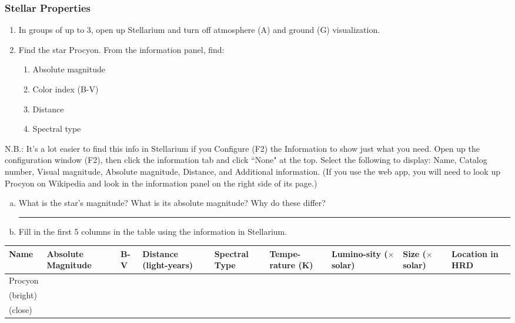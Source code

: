 \documentclass[main.tex]{subfiles}
\begin{document}
\subsubsection{Stellar Properties}
\begin{enumerate}
\item In groups of up to 3, open up Stellarium and turn off atmosphere (A) and ground (G) visualization.
\item Find the star Procyon. From the information panel, find:
	\begin{enumerate}
	\item Absolute magnitude
	\item Color index (B-V)
	\item Distance
	\item Spectral type
	\end{enumerate}
\end{enumerate}
N.B.: It's a lot easier to find this info in Stellarium if you Configure (F2) the Information to show just what you need. Open up the configuration window (F2), then click the information tab and click ``None" at the top. Select the following to display: Name, Catalog number, Visual magnitude, Absolute magnitude, Distance, and Additional information. (If you use the web app, you will need to look up Procyon on Wikipedia and look in the information panel on the right side of its page.)

\begin{enumerate}[a.]
\item What is the star's magnitude? What is its absolute magnitude? Why do these differ? 

\rule{15cm}{.15mm}
\item Fill in the first 5 columns in the table using the information in Stellarium.
\end{enumerate}
\begin{table}[h!]
\begin{center}
\begin{tabular}{|p{1.5cm}|p{1.5cm}|p{1cm}|p{1.5cm}|p{1.5cm}|p{1.5cm}|p{1.5cm}|p{1.5cm}|p{1.5cm}|}\hline
Name & Absolute Magnitude & B-V & Distance (light-years) & Spectral Type & Tempe-rature (K) & Lumino-sity ($\times$ solar) & Size ($\times$ solar) & Location in HRD \\\hline
Procyon

 &&&&&&&&\\\hline
(bright)


 &&&&&&&&\\\hline
(close)


 &&&&&&&&\\\hline
\end{tabular}
\end{center}
\label{tab:star}
\end{table}
\vspace{-30pt}
\end{document}
